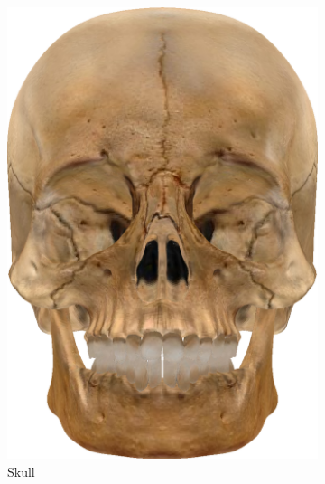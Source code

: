 \begin{figure}[h]
\begin{subfigure}[b]{0.18\textwidth}
        \includegraphics[width=\textwidth]{img/textures/OriginalSkull.png}
        \caption{Skull}
        \label{fig:OriginalSkull}
	\end{subfigure}
    ~
    \begin{subfigure}[b]{0.18\textwidth}

\end{subfigure}
\end{figure}

